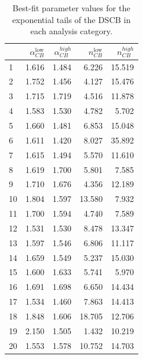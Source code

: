 \begin{table}[!htp]
\begin{center}
\begin{tabular}{lrrrr}
        \hline
        {} & $\alpha_{CB}^\text{low}$ & $\alpha_{CB}^{high}$ & $n_{CB}^\text{low}$ & $n_{CB}^{high}$ \\
        \hline
        1 & 1.616 & 1.484 & 6.226 & 15.519 \\
        2 & 1.752 & 1.456 & 4.127 & 15.476 \\
        3 & 1.715 & 1.719 & 4.516 & 11.878 \\
        4 & 1.583 & 1.530 & 4.782 & 5.702 \\
        5 & 1.660 & 1.481 & 6.853 & 15.048 \\
        6 & 1.611 & 1.420 & 8.027 & 35.892 \\
        7 & 1.615 & 1.494 & 5.570 & 11.610 \\
        8 & 1.619 & 1.700 & 5.801 & 7.585 \\
        9 & 1.710 & 1.676 & 4.356 & 12.189 \\
        10 & 1.804 & 1.597 & 13.580 & 7.932 \\
        11 & 1.700 & 1.594 & 4.740 & 7.589 \\
        12 & 1.531 & 1.530 & 8.478 & 13.347\\ \hline
        13 & 1.597& 1.546 & 6.806 & 11.117\\
        14 & 1.659 & 1.549 & 5.237 & 15.030\\
        15 & 1.600 & 1.633 & 5.741 & 5.970\\
        16 & 1.691 & 1.698 & 6.650 & 14.434 \\
        17 & 1.534 & 1.460 & 7.863 & 14.413 \\
        18 & 1.848 & 1.606 & 18.705 & 12.706 \\
        19 & 2.150 & 1.505 & 1.432 & 10.219\\
        20 & 1.553 & 1.578 & 10.752 & 14.703\\
        \hline
\end{tabular}
\caption{Best-fit parameter values for the exponential tails of the DSCB in each analysis category.}
\label{tab:sig_param2}
\end{center}
\end{table}


